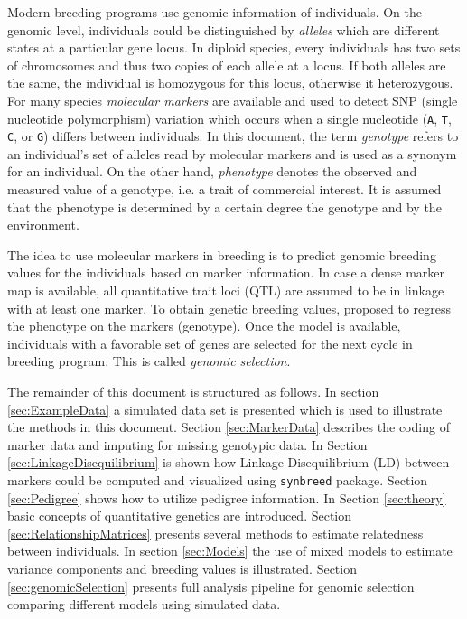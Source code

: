 \documentclass[a4paper,11pt]{article}
\begin{document}
Modern breeding programs use genomic information of individuals. On the genomic level, individuals could be distinguished by \textit{alleles} which are different states at a particular gene locus. In diploid species, every individuals has two sets of chromosomes and thus two copies of each allele at a locus. 
If both alleles are the same, the individual is homozygous for this locus, otherwise it heterozygous. For many species  \textit{molecular markers} are available and used to detect SNP (single nucleotide polymorphism) variation which occurs when a single nucleotide (\texttt{A}, \texttt{T}, \texttt{C}, or \texttt{G}) differs between individuals.
 In this document, the term \textit{genotype} refers to an individual's set of alleles read by molecular markers and is used as a synonym for an individual. On the other hand, \textit{phenotype} denotes the observed and measured value of a genotype, i.e. a trait
of commercial interest. It is assumed that the phenotype is determined by a certain degree the genotype and by the environment.

The idea to use molecular markers in breeding is to predict genomic breeding values for the individuals based on  marker information. In case a dense marker map is available, all quantitative
trait loci (QTL) are assumed to be in linkage with at least one
marker. To obtain genetic breeding values, \citet{Meuwissen2001} proposed to regress the phenotype on the markers (genotype). Once the model is available, individuals with a favorable set of genes are selected for the next cycle in breeding program. This is called \textit{genomic selection}.

The remainder of this document is structured as follows. In section \ref{sec:ExampleData} a simulated data set is presented which is used to illustrate the methods in this document. Section \ref{sec:MarkerData} describes the coding of marker data and imputing for missing genotypic data. 
In Section \ref{sec:LinkageDisequilibrium} is shown how Linkage Disequilibrium (LD) between markers could be computed and visualized using \texttt{synbreed} package.  
Section \ref{sec:Pedigree} shows how to utilize pedigree information. In Section \ref{sec:theory} basic concepts of quantitative genetics are introduced. Section \ref{sec:RelationshipMatrices} presents several methods to estimate relatedness between individuals. 
In section \ref{sec:Models} the use of mixed models to estimate variance components and breeding values is illustrated. Section \ref{sec:genomicSelection} presents full analysis pipeline for genomic selection comparing different models  using simulated data.
\end{document}
